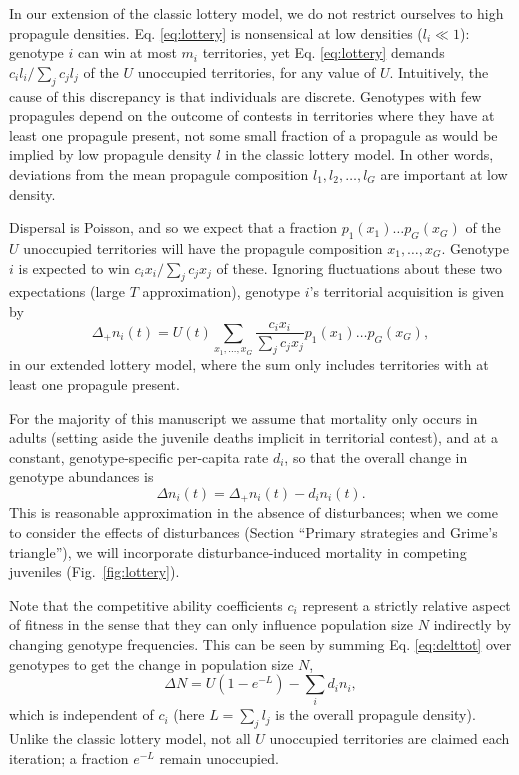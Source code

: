 \documentclass[11pt]{article}
\begin{document}
In our extension of the classic lottery model, we do not restrict ourselves to high propagule densities. Eq. \eqref{eq:lottery} is nonsensical at low densities ($l_i\ll 1$): genotype $i$ can win at most $m_i$ territories, yet Eq. \eqref{eq:lottery} demands $c_i l_i/\sum_j c_j l_j$ of the $U$ unoccupied territories, for any value of $U$. Intuitively, the cause of this discrepancy is that individuals are discrete. Genotypes with few propagules depend on the outcome of contests in territories where they have at least one propagule present, not some small fraction of a propagule as would be implied by low propagule density $l$ in the classic lottery model. In other words, deviations from the mean propagule composition $l_1,l_2,\ldots,l_G$ are important at low density. 

Dispersal is Poisson, and so we expect that a fraction $p_1(x_1)\ldots p_G(x_G)$ of the $U$ unoccupied territories will have the propagule composition $x_1,\ldots,x_G$. Genotype $i$ is expected to win $c_i x_i/\sum_j c_j x_j$ of these. Ignoring fluctuations about these two expectations (large $T$ approximation), genotype $i$'s territorial acquisition is given by
\begin{equation}
\Delta_+ n_i(t)=U(t)\sum_{x_1,\ldots,x_G} \frac{c_i x_i}{\sum_j c_j x_j} p_1(x_1)\ldots p_G(x_G), \label{eq:growthsumuncoupled}
\end{equation}
in our extended lottery model, where the sum only includes territories with at least one propagule present. 

For the majority of this manuscript we assume that mortality only occurs in adults (setting aside the juvenile deaths implicit in territorial contest), and at a constant, genotype-specific per-capita rate $d_i$, so that the overall change in genotype abundances is
\begin{equation}
\Delta n_i(t)=\Delta_+ n_i(t)-d_i n_i(t). \label{eq:delttot}
\end{equation}
This is reasonable approximation in the absence of disturbances; when we come to consider the effects of disturbances (Section ``Primary strategies and Grime's triangle''), we will incorporate disturbance-induced mortality in competing juveniles (Fig.~\ref{fig:lottery}). 

Note that the competitive ability coefficients $c_i$ represent a strictly relative aspect of fitness in the sense that they can only influence population size $N$ indirectly by changing genotype frequencies. This can be seen by summing Eq. \eqref{eq:delttot} over genotypes to get the  change in population size $N$, 
\begin{equation}
\Delta N=U(1-e^{-L})-\sum_i d_i n_i,\label{eq:deltN}
\end{equation}
which is independent of $c_i$ (here $L=\sum_j l_j$ is the overall propagule density). Unlike the classic lottery model, not all $U$ unoccupied territories are claimed each iteration; a fraction $e^{-L}$ remain unoccupied.
\end{document}

